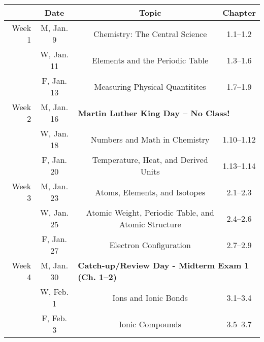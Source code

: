 \documentclass[12pt, letterpaper]{article}
\begin{document}
\begin{tabular}{rcccc}
	       & Date       &                                                                              & Topic                                               & Chapter    \\
	\midrule
	Week 1 & M, Jan. 9  &                                                                              & Chemistry: The Central Science                      & 1.1--1.2   \\
	       & W, Jan. 11 &                                                                              & Elements and the Periodic Table                     & 1.3--1.6   \\
	       & F, Jan. 13 &                                                                              & Measuring Physical Quantitites                      & 1.7--1.9   \\
	\midrule
	Week 2 & M, Jan. 16 & \multicolumn{3}{l}{\textbf{Martin Luther King Day -- No Class!}}                                                                                \\
	       & W, Jan. 18 &                                                                              & Numbers and Math in Chemistry                       & 1.10--1.12 \\
	       & F, Jan. 20 &                                                                              & Temperature, Heat, and Derived Units                & 1.13--1.14 \\
	\midrule
	Week 3 & M, Jan. 23 &                                                                              & Atoms, Elements, and Isotopes                       & 2.1--2.3   \\
	       & W, Jan. 25 &                                                                              & Atomic Weight, Periodic Table, and Atomic Structure & 2.4--2.6   \\
	       & F, Jan. 27 &                                                                              & Electron Configuration                              & 2.7--2.9   \\
	\midrule
	Week 4 & M, Jan. 30 & \multicolumn{3}{l}{\textbf{Catch-up/Review Day - Midterm Exam 1 (Ch. 1--2)}}                                                                    \\
	       & W, Feb. 1  &                                                                              & Ions and Ionic Bonds                                & 3.1--3.4   \\
	       & F, Feb. 3  &                                                                              & Ionic Compounds                                     & 3.5--3.7   \\
\end{tabular}
\end{document}

